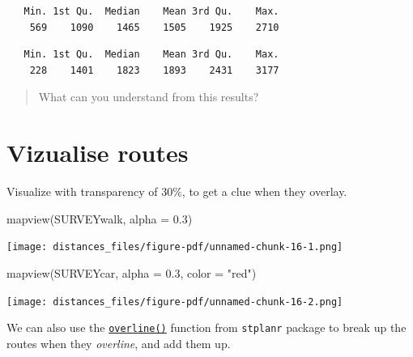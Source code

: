 \documentclass[
  letterpaper,
  DIV=11,
  numbers=noendperiod]{scrreprt}
\newenvironment{Shaded}{\begin{snugshade}}{\end{snugshade}}
\newcommand{\AttributeTok}[1]{\textcolor[rgb]{0.40,0.45,0.13}{#1}}
\newcommand{\CommentTok}[1]{\textcolor[rgb]{0.37,0.37,0.37}{#1}}
\newcommand{\FloatTok}[1]{\textcolor[rgb]{0.68,0.00,0.00}{#1}}
\newcommand{\FunctionTok}[1]{\textcolor[rgb]{0.28,0.35,0.67}{#1}}
\newcommand{\NormalTok}[1]{\textcolor[rgb]{0.00,0.23,0.31}{#1}}
\newcommand{\SpecialCharTok}[1]{\textcolor[rgb]{0.37,0.37,0.37}{#1}}
\newcommand{\StringTok}[1]{\textcolor[rgb]{0.13,0.47,0.30}{#1}}
\begin{document}
\begin{verbatim}
   Min. 1st Qu.  Median    Mean 3rd Qu.    Max. 
    569    1090    1465    1505    1925    2710 
\end{verbatim}

\begin{Shaded}
\end{Shaded}

\begin{verbatim}
   Min. 1st Qu.  Median    Mean 3rd Qu.    Max. 
    228    1401    1823    1893    2431    3177 
\end{verbatim}

\begin{quote}
What can you understand from this results?
\end{quote}

\section{Vizualise routes}\label{vizualise-routes}

Visualize with transparency of 30\%, to get a clue when they overlay.

\begin{Shaded}
\begin{Highlighting}[]
\FunctionTok{mapview}\NormalTok{(SURVEYwalk, }\AttributeTok{alpha =} \FloatTok{0.3}\NormalTok{)}
\end{Highlighting}
\end{Shaded}

\texttt{[image: distances\_files/figure-pdf/unnamed-chunk-16-1.png]}

\begin{Shaded}
\begin{Highlighting}[]
\FunctionTok{mapview}\NormalTok{(SURVEYcar, }\AttributeTok{alpha =} \FloatTok{0.3}\NormalTok{, }\AttributeTok{color =} \StringTok{"red"}\NormalTok{)}
\end{Highlighting}
\end{Shaded}

\texttt{[image: distances\_files/figure-pdf/unnamed-chunk-16-2.png]}

We can also use the
\href{https://docs.ropensci.org/stplanr/reference/overline.html}{\texttt{overline()}}
function from \texttt{stplanr} package to break up the routes when they
\emph{overline}, and add them up.
\end{document}
